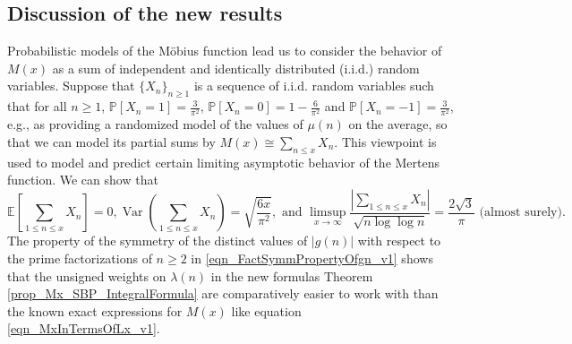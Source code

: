 \documentclass[11pt,reqno,a4letter]{article}
\newcommand{\hlocalref}[1]{\hyperref[#1]{\ref{#1}}}
\numberwithin{equation}{section}
\numberwithin{figure}{section}
\numberwithin{table}{section}
\theoremstyle{plain}
\numberwithin{theorem}{section}
\theoremstyle{definition}
\begin{document}
\subsection{Discussion of the new results}

Probabilistic models of the M\"obius function lead us to consider the behavior of $M(x)$ 
as a sum of independent and identically distributed (i.i.d.) random variables. 
Suppose that $\{X_n\}_{n \geq 1}$ is a sequence of i.i.d. random variables 
such that for all $n \geq 1$, 
$\mathbb{P}[X_n = 1] = \frac{3}{\pi^2}$, $\mathbb{P}[X_n = 0] = 1 - \frac{6}{\pi^2}$ and 
$\mathbb{P}[X_n = -1] = \frac{3}{\pi^2}$, 
e.g., as providing a randomized model of the values of $\mu(n)$ on the average, 
so that we can model its partial sums by $M(x) \cong \sum_{n \leq x} X_n$. 
This viewpoint is used to model and predict certain limiting asymptotic behavior of the 
Mertens function. 
We can show that
\[
\mathbb{E}\left[\sum_{1 \leq n \leq x} X_n\right] = 0, 
     \operatorname{Var}\left(\sum_{1 \leq n \leq x} X_n\right) = \sqrt{\frac{6x}{\pi^2}}, 
     \text{ and } 
     \limsup_{x \rightarrow \infty} \frac{\left\lvert \sum\limits_{1 \leq n \leq x} X_n 
     \right\rvert}{\sqrt{n \log\log n}} = \frac{2\sqrt{3}}{\pi}
     \text{ (almost surely).} 
\]
The property of the symmetry of the distinct values of $|g(n)|$ with respect to the 
prime factorizations of $n \geq 2$ in \eqref{eqn_FactSymmPropertyOfgn_v1} 
shows that the unsigned weights on $\lambda(n)$ in 
the new formulas Theorem \hlocalref{prop_Mx_SBP_IntegralFormula} 
are comparatively easier to work with than the known 
exact expressions for $M(x)$ like equation \eqref{eqn_MxInTermsOfLx_v1}. 
\end{document}
